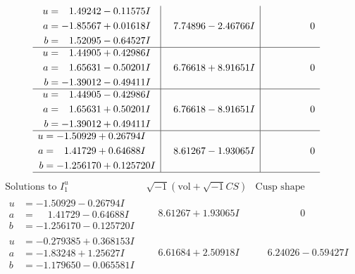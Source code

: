 \documentclass[1p]{elsarticle_modified}
\theoremstyle{definition}
\newcommand{\I}{\sqrt{-1}}
\begin{document}
$$\begin{array}{c|c|c}
\begin{aligned}
u &= \phantom{-}1.49242 - 0.11575 I \\
a &= -1.85567 + 0.01618 I \\
b &= \phantom{-}1.52095 - 0.64527 I\end{aligned}
 & \phantom{-}7.74896 - 2.46766 I & \phantom{-0.000000 } 0 \\ \hline\begin{aligned}
u &= \phantom{-}1.44905 + 0.42986 I \\
a &= \phantom{-}1.65631 - 0.50201 I \\
b &= -1.39012 - 0.49411 I\end{aligned}
 & \phantom{-}6.76618 + 8.91651 I & \phantom{-0.000000 } 0 \\ \hline\begin{aligned}
u &= \phantom{-}1.44905 - 0.42986 I \\
a &= \phantom{-}1.65631 + 0.50201 I \\
b &= -1.39012 + 0.49411 I\end{aligned}
 & \phantom{-}6.76618 - 8.91651 I & \phantom{-0.000000 } 0 \\ \hline\begin{aligned}
u &= -1.50929 + 0.26794 I \\
a &= \phantom{-}1.41729 + 0.64688 I \\
b &= -1.256170 + 0.125720 I\end{aligned}
 & \phantom{-}8.61267 - 1.93065 I & \phantom{-0.000000 } 0\\
 \hline 
 \end{array}$$\newpage$$\begin{array}{c|c|c}  
\text{Solutions to }I^u_{1}& \I (\text{vol} + \sqrt{-1}CS) & \text{Cusp shape}\\
 \hline 
\begin{aligned}
u &= -1.50929 - 0.26794 I \\
a &= \phantom{-}1.41729 - 0.64688 I \\
b &= -1.256170 - 0.125720 I\end{aligned}
 & \phantom{-}8.61267 + 1.93065 I & \phantom{-0.000000 } 0 \\ \hline\begin{aligned}
u &= -0.279385 + 0.368153 I \\
a &= -1.83248 + 1.25627 I \\
b &= -1.179650 - 0.065581 I\end{aligned}
 & \phantom{-}6.61684 + 2.50918 I & \phantom{-}6.24026 - 0.59427 I \\ \hline\begin{aligned}

\end{aligned}
\end{array}$$
\end{document}
